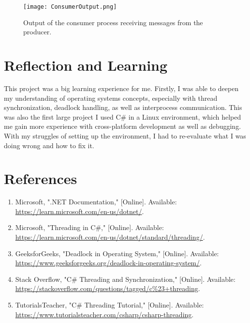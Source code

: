 \documentclass{article}
\begin{document}
\begin{figure}[H] %
    \centering
    \texttt{[image: ConsumerOutput.png]}
    \caption{Output of the consumer process receiving messages from the producer.}
    \label{fig:consumer_output}
\end{figure}

\clearpage %

\section*{Reflection and Learning}

This project was a big learning experience for me. Firstly, I was able to deepen my understanding of operating systems concepts, especially with thread synchronization, deadlock handling, as well as interprocess communication. This was also the first large project I used C\# in a Linux environment, which helped me gain more experience with cross-platform development as well as debugging. With my struggles of setting up the environment, I had to re-evaluate what I was doing wrong and how to fix it.

\section*{References}

\begin{enumerate}
    \item Microsoft, ".NET Documentation," [Online]. Available: \url{https://learn.microsoft.com/en-us/dotnet/}.
    \item Microsoft, "Threading in C\#," [Online]. Available: \url{https://learn.microsoft.com/en-us/dotnet/standard/threading/}.
    \item GeeksforGeeks, "Deadlock in Operating System," [Online]. Available: \url{https://www.geeksforgeeks.org/deadlock-in-operating-system/}.
    \item Stack Overflow, "C\# Threading and Synchronization," [Online]. Available: \url{https://stackoverflow.com/questions/tagged/c%23+threading}.
    \item TutorialsTeacher, "C\# Threading Tutorial," [Online]. Available: \url{https://www.tutorialsteacher.com/csharp/csharp-threading}.
\end{enumerate}
\end{document}
